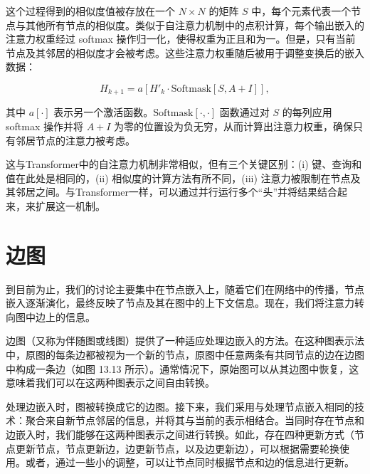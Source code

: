 这个过程得到的相似度值被存放在一个 \(N \times N\) 的矩阵 \(S\) 中，每个元素代表一个节点与其他所有节点的相似度。类似于自注意力机制中的点积计算，每个输出嵌入的注意力权重经过 softmax 操作归一化，使得权重为正且和为一。但是，只有当前节点及其邻居的相似度才会被考虑。这些注意力权重随后被用于调整变换后的嵌入数据：

\begin{equation}
H_{k+1} = a \left[ H'_k \cdot \text{Softmask}[S, A + I] \right], 
\end{equation}

其中 \(a[\cdot]\) 表示另一个激活函数。\(\text{Softmask}[\cdot,\cdot]\) 函数通过对 \(S\) 的每列应用 softmax 操作并将 \(A + I\) 为零的位置设为负无穷，从而计算出注意力权重，确保只有邻居节点的注意力被考虑。

这与Transformer中的自注意力机制非常相似，但有三个关键区别：(i) 键、查询和值在此处是相同的，(ii) 相似度的计算方法有所不同，(iii) 注意力被限制在节点及其邻居之间。与Transformer一样，可以通过并行运行多个“头”并将结果结合起来，来扩展这一机制。

\section{边图}
到目前为止，我们的讨论主要集中在节点嵌入上，随着它们在网络中的传播，节点嵌入逐渐演化，最终反映了节点及其在图中的上下文信息。现在，我们将注意力转向图中边上的信息。

边图（又称为伴随图或线图）提供了一种适应处理边嵌入的方法。在这种图表示法中，原图的每条边都被视为一个新的节点，原图中任意两条有共同节点的边在边图中构成一条边（如图 13.13 所示）。通常情况下，原始图可以从其边图中恢复，这意味着我们可以在这两种图表示之间自由转换。

处理边嵌入时，图被转换成它的边图。接下来，我们采用与处理节点嵌入相同的技术：聚合来自新节点邻居的信息，并将其与当前的表示相结合。当同时存在节点和边嵌入时，我们能够在这两种图表示之间进行转换。如此，存在四种更新方式（节点更新节点，节点更新边，边更新节点，以及边更新边），可以根据需要轮换使用。或者，通过一些小的调整，可以让节点同时根据节点和边的信息进行更新。

